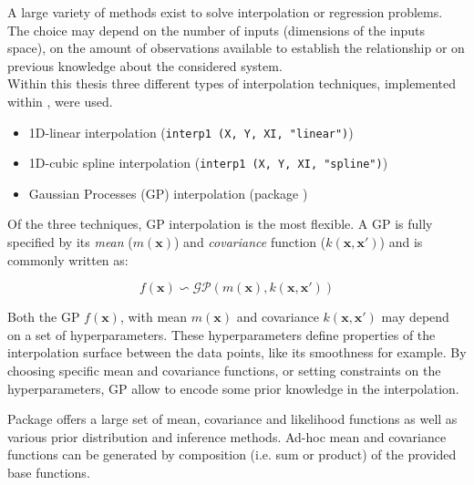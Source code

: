 A large variety of methods exist to solve interpolation or regression problems. The choice may depend on the number of inputs (dimensions of the inputs space), on the amount of observations available to establish the relationship or on previous knowledge about the considered system.\\
 
 
Within this thesis three different types of interpolation techniques, implemented within , were used.

\begin{itemize}
\itemsep0em
  \item 1D-linear interpolation (\texttt{interp1 (X, Y, XI, "linear")})
  \item 1D-cubic spline interpolation (\texttt{interp1 (X, Y, XI, "spline")})
  \item Gaussian Processes (GP) interpolation (package )
\end{itemize}

 
Of the three techniques, GP interpolation is the most flexible.   
A GP is fully specified by its \emph{mean} ($m(\bm{x})$) and \emph{covariance} function ($k(\bm{x},\bm{x}')$) \autocite{rasmussen_gaussian_2006} and is commonly written as:

\begin{equation}
  f(\bm{x}) \backsim \mathcal{GP}\left(m(\bm{x}), k(\bm{x},\bm{x}')\right)
\end{equation}

Both the GP $f(\bm{x})$, with mean $m(\bm{x})$ and covariance $k(\bm{x},\bm{x}')$ may depend on a set of hyperparameters. These hyperparameters define properties of the interpolation surface between the data points, like its smoothness for example. By choosing specific mean and covariance functions, or setting constraints on the hyperparameters, GP allow to encode some prior knowledge in the interpolation.

Package  offers a large set of mean, covariance and likelihood functions as well as various prior distribution and inference methods. Ad-hoc mean and covariance functions can be generated by composition  (i.e. sum or product) of the provided base functions. 


